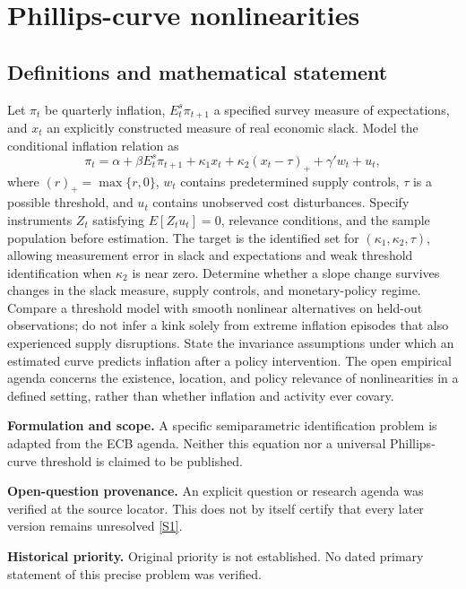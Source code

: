 \documentclass[11pt]{article}
\newcommand{\sref}[2]{\hyperlink{source:#1:#2}{[S#2]}}
\begin{document}
\section*{Phillips-curve nonlinearities}\label{30007523}
\subsection{Definitions and mathematical statement}
Let \(\pi_t\) be quarterly inflation, \(E_t^s\pi_{t+1}\) a specified survey measure of expectations, and \(x_t\) an explicitly constructed measure of real economic slack. Model the conditional inflation relation as
\[
\pi_t=\alpha+\beta E_t^s\pi_{t+1}
+\kappa_1 x_t+\kappa_2(x_t-\tau)_+
+\gamma'w_t+u_t,
\]
where \((r)_+=\max\{r,0\}\), \(w_t\) contains predetermined supply controls, \(\tau\) is a possible threshold, and \(u_t\) contains unobserved cost disturbances. Specify instruments \(Z_t\) satisfying \(E[Z_tu_t]=0\), relevance conditions, and the sample population before estimation.
The target is the identified set for \((\kappa_1,\kappa_2,\tau)\), allowing measurement error in slack and expectations and weak threshold identification when \(\kappa_2\) is near zero. Determine whether a slope change survives changes in the slack measure, supply controls, and monetary-policy regime. Compare a threshold model with smooth nonlinear alternatives on held-out observations; do not infer a kink solely from extreme inflation episodes that also experienced supply disruptions. State the invariance assumptions under which an estimated curve predicts inflation after a policy intervention. The open empirical agenda concerns the existence, location, and policy relevance of nonlinearities in a defined setting, rather than whether inflation and activity ever covary.

\par\textbf{Formulation and scope.} A specific semiparametric identification problem is adapted from the ECB agenda. Neither this equation nor a universal Phillips-curve threshold is claimed to be published.

\par\textbf{Open-question provenance.} An explicit question or research agenda was verified at the source locator. This does not by itself certify that every later version remains unresolved \sref{30007523}{1}.

\par\textbf{Historical priority.} Original priority is not established. No dated primary statement of this precise problem was verified.
\end{document}
